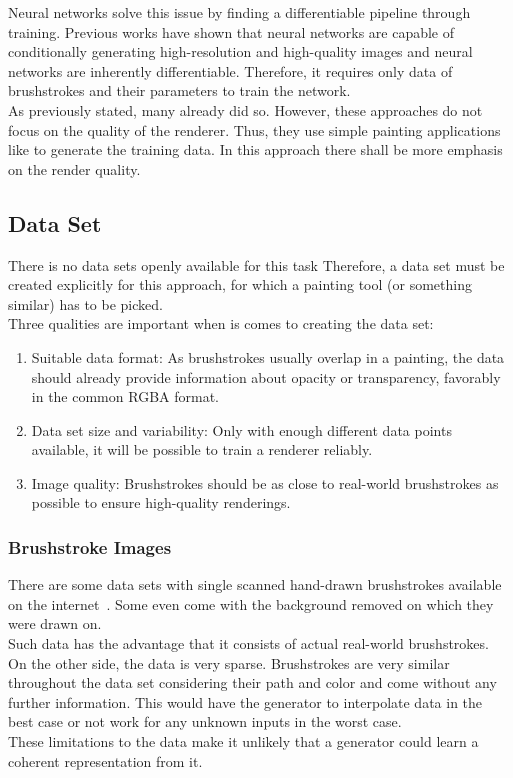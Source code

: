 Neural networks solve this issue by finding a differentiable pipeline through training.
Previous works have shown that neural networks are capable of conditionally generating high-resolution and high-quality images and neural networks are inherently differentiable.
Therefore, it requires only data of brushstrokes and their parameters to train the network.\\
As previously stated, many already did so.
However, these approaches do not focus on the quality of the renderer.
Thus, they use simple painting applications like  to generate the training data.
In this approach there shall be more emphasis on the render quality.

\subsection{Data Set}
There is no data sets openly available for this task
Therefore, a data set must be created explicitly for this approach, for which a painting tool (or something similar) has to be picked.\\
Three qualities are important when is comes to creating the data set:
\begin{enumerate}
    \item Suitable data format: As brushstrokes usually overlap in a painting, the data should already provide information about opacity or transparency, favorably in the common RGBA format.
    \item Data set size and variability: Only with enough different data points available, it will be possible to train a renderer reliably.
    \item Image quality: Brushstrokes should be as close to real-world brushstrokes as possible to ensure high-quality renderings.
\end{enumerate}

\subsubsection{Brushstroke Images}
There are some data sets with single scanned hand-drawn brushstrokes available on the internet~\cite{zolee_on_onlygfx}.
Some even come with the background removed on which they were drawn on.\\
Such data has the advantage that it consists of actual real-world brushstrokes.
On the other side, the data is very sparse.
Brushstrokes are very similar throughout the data set considering their path and color and come without any further information.
This would have the generator to interpolate data in the best case or not work for any unknown inputs in the worst case.\\
These limitations to the data make it unlikely that a generator could learn a coherent representation from it.

